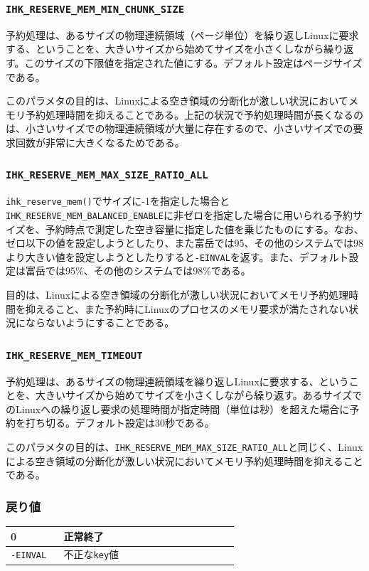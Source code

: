 \documentclass[twoside,11pt,fleqn]{book}
\begin{document}
\subsubsection*{\texttt{IHK\_RESERVE\_MEM\_MIN\_CHUNK\_SIZE}}
予約処理は、あるサイズの物理連続領域（ページ単位）を繰り返しLinuxに要求する、ということを、大きいサイズから始めてサイズを小さくしながら繰り返す。このサイズの下限値を指定された値にする。デフォルト設定はページサイズである。

このパラメタの目的は、Linuxによる空き領域の分断化が激しい状況においてメモリ予約処理時間を抑えることである。上記の状況で予約処理時間が長くなるのは、小さいサイズでの物理連続領域が大量に存在するので、小さいサイズでの要求回数が非常に大きくなるためである。

\subsubsection*{\texttt{IHK\_RESERVE\_MEM\_MAX\_SIZE\_RATIO\_ALL}}
\verb|ihk_reserve_mem()|でサイズに-1を指定した場合と\verb|IHK_RESERVE_MEM_BALANCED_ENABLE|に非ゼロを指定した場合に用いられる予約サイズを、予約時点で測定した空き容量に指定した値を乗じたものにする。なお、ゼロ以下の値を設定しようとしたり、また富岳では95、その他のシステムでは98より大きい値を設定しようとしたりすると\verb:-EINVAL:を返す。また、デフォルト設定は富岳では95\%、その他のシステムでは98\%である。

目的は、Linuxによる空き領域の分断化が激しい状況においてメモリ予約処理時間を抑えること、また予約時にLinuxのプロセスのメモリ要求が満たされない状況にならないようにすることである。

\subsubsection*{\texttt{IHK\_RESERVE\_MEM\_TIMEOUT}}
予約処理は、あるサイズの物理連続領域を繰り返しLinuxに要求する、ということを、大きいサイズから始めてサイズを小さくしながら繰り返す。あるサイズでのLinuxへの繰り返し要求の処理時間が指定時間（単位は秒）を超えた場合に予約を打ち切る。デフォルト設定は30秒である。

このパラメタの目的は、\texttt{IHK\_RESERVE\_MEM\_MAX\_SIZE\_RATIO\_ALL}と同じく、Linuxによる空き領域の分断化が激しい状況においてメモリ予約処理時間を抑えることである。

\subsubsection*{戻り値}{\quad}
\begin{table}[!h]
\footnotesize
\begin{tabular}{|p{0.20\linewidth}|p{0.66\linewidth}|} \hline
0&正常終了\\ \hline
\texttt{-EINVAL}&不正な\texttt{key}値\\ \hline
\end{tabular}
\vspace{-0em}
\end{table}
\FloatBarrier
\end{document}
